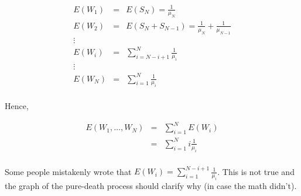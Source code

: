 \documentclass[10pt,a4paper]{article}
\begin{document}
\begin{flushleft}
\begin{eqnarray*}
E(W_1)&=& E(S_N)=\frac{1}{\mu_N}\\
E(W_2)&=& E(S_N+S_{N-1})=\frac{1}{\mu_N}+\frac{1}{\mu_{N-1}}\\
\vdots\\
E(W_i)&=& \sum_{i=N-i+1}^N \frac{1}{\mu_i} \\
\vdots\\
E(W_N)&=& \sum_{i=1}^N \frac{1}{\mu_i}\\
\end{eqnarray*}

Hence,

\begin{eqnarray*}
E(W_1,\ldots,W_N)&=& \sum_{i=1}^N E(W_i)\\
&=& \sum_{i=1}^N i \frac{1}{\mu_i} \\
\end{eqnarray*}


Some people mistakenly wrote that $E(W_i)= \sum_{i=1}^{N-i+1}
\frac{1}{\mu_i}$. This is not true and the graph of the pure-death
process should clarify why (in case the math didn't).
\begin{eqnarray*}
\\
\end{eqnarray*}

\end{flushleft}
\end{document}
